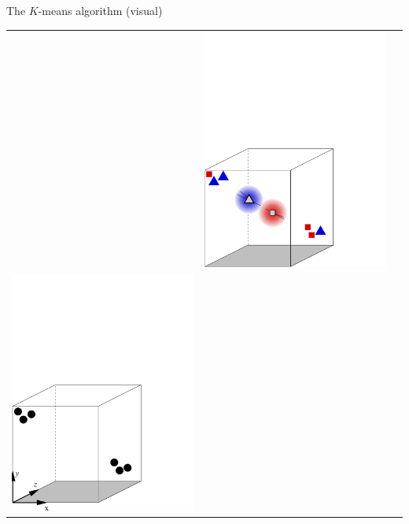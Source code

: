 \documentclass{beamer}
\begin{document}
\begin{frame}{The $K$-means algorithm (visual)}
\begin{tabular}{ccc}
&
\includegraphics[height=0.4\textheight]{3d-kmeans2.pdf}
\\
\includegraphics[height=0.4\textheight]{3d-data2.pdf}

\end{tabular}
\end{frame}
\end{document}
